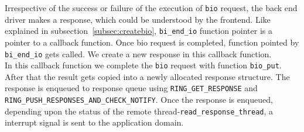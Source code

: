 Irrespective of the success or failure of the execution of \texttt{bio} request, the back end driver makes a response, which could be understood by the frontend. Like explained in subsection~\ref{subsec:createbio}, \texttt{bi\_end\_io} function pointer is a pointer to a callback function. Once bio request is completed, function pointed by \texttt{bi\_end\_io} gets called. We create a new response in this callback function.
\\
In this callback function we complete the \texttt{bio} request with function \texttt{bio\_put}. After that the result gets copied into a newly allocated response structure. The response is enqueued to response queue using \texttt{RING\_GET\_RESPONSE} and \texttt{RING\_PUSH\_RESPONSES\_AND\_CHECK\_NOTIFY}. Once the response is enqueued, depending upon the status of the remote thread-\texttt{read\_response\_thread}, a interrupt signal is sent to the application domain.

% 
